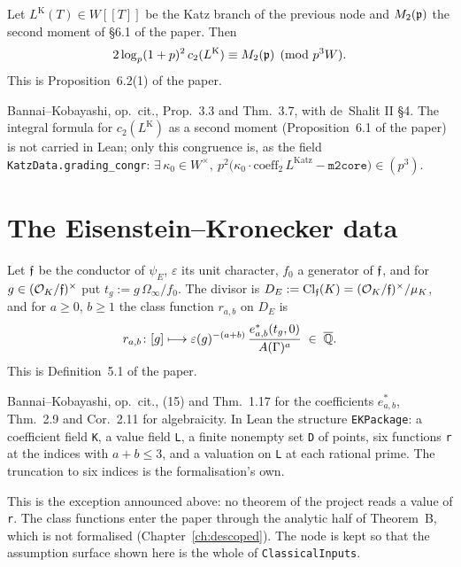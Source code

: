 \begin{assumption}
  \label{assum:GradingCongruence}
  \leanok
  Let $L^{\mathrm{K}}(T) \in W[[T]]$ be the Katz branch of the previous node
  and $M_2({\mathfrak{p}})$ the second moment of \S 6.1 of the paper. Then
  \[
    2\log_p(1+p)^2\, c_2(L^{\mathrm{K}}) \equiv M_2({\mathfrak{p}}) \pmod{p^3 W} .
  \]
  This is Proposition~6.2(1) of the paper.

  Bannai--Kobayashi, op.\ cit., Prop.~3.3 and Thm.~3.7, with de~Shalit II
  \S 4. The integral formula for $c_2(L^{\mathrm{K}})$ as a second moment
  (Proposition~6.1 of the paper) is not carried in Lean; only this
  congruence is, as the field \texttt{KatzData.grading\_congr}:
  $\exists\, \kappa_0 \in W^\times,\ p^2\bigl(\kappa_0 \cdot
  \mathrm{coeff}_2\,L^{\mathrm{Katz}} - \texttt{m2core}\bigr) \in (p^3)$.
\end{assumption}

\section{The Eisenstein--Kronecker data}

\begin{assumption}
  \label{assum:ClassFunctions}
  \leanok
  Let ${\mathfrak{f}}$ be the conductor of $\psi_E$, $\varepsilon$ its unit character,
  $f_0$ a generator of ${\mathfrak{f}}$, and for $g \in ({\mathcal{O}_K}/{\mathfrak{f}})^\times$ put
  $t_g := g\,\Omega_\infty/f_0$. The divisor is
  $D_E := \mathrm{Cl}_{\mathfrak{f}}(K) = ({\mathcal{O}_K}/{\mathfrak{f}})^\times/\mu_K$, and for $a \ge 0$,
  $b \ge 1$ the class function $r_{a,b}$ on $D_E$ is
  \[
    r_{a,b} \colon [g] \longmapsto
      \varepsilon(g)^{-(a+b)}\, \frac{e^*_{a,b}(t_g, 0)}{A(\Gamma)^a}
      \;\in\; {\overline{\mathbb{Q}}} .
  \]
  This is Definition~5.1 of the paper.

  Bannai--Kobayashi, op.\ cit., (15) and Thm.~1.17 for the coefficients
  $e^*_{a,b}$, Thm.~2.9 and Cor.~2.11 for algebraicity. In Lean the structure
  \texttt{EKPackage}: a coefficient field \texttt{K}, a value field
  \texttt{L}, a finite nonempty set \texttt{D} of points, six functions
  \texttt{r} at the indices with $a + b \le 3$, and a valuation on
  \texttt{L} at each rational prime. The truncation to six indices is the
  formalisation's own.

  This is the exception announced above: no theorem of the project reads a
  value of \texttt{r}. The class functions enter the paper through the
  analytic half of Theorem~B, which is not formalised
  (Chapter~\ref{ch:descoped}). The node is kept so that the assumption
  surface shown here is the whole of \texttt{ClassicalInputs}.
\end{assumption}

